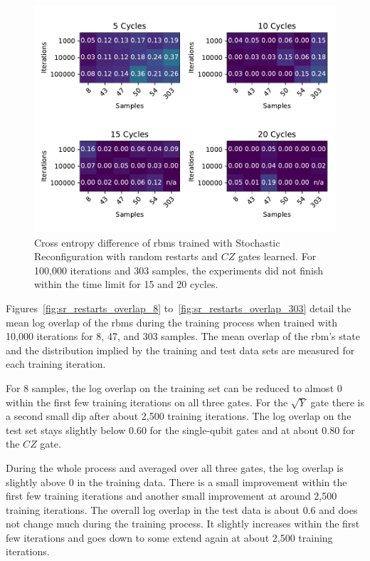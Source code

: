 \begin{figure}[H]
  \centering
  \includegraphics[width=\textwidth]{figures/results/sr-restarts-learned/fxeb_heatmap.pdf}
  \caption[Cross Entropy Difference of RBMs Trained with Stochastic Reconfiguration with Random Restarts and $CZ$ Gates Learned]{
  Cross entropy difference of \gls{rbm}s trained with Stochastic Reconfiguration with random restarts and $CZ$ gates learned.
  For 100,000 iterations and 303 samples, the experiments did not finish within the time limit for 15 and 20 cycles.}
  \label{fig:sr_restarts_fxeb}
\end{figure}

Figures~\ref{fig:sr_restarts_overlap_8} to~\ref{fig:sr_restarts_overlap_303} detail the mean log overlap of the \gls{rbm}s during the 
training process when trained with 10,000 iterations for 8, 47, and 303 samples. The 
mean overlap of the \gls{rbm}'s state and the distribution implied by the training and test data sets are measured 
for each training iteration.

For 8 samples, the log overlap on the training set can be reduced to almost 0 within the first few training iterations 
on all three gates. For the $\sqrt{Y}$ gate there is a second small dip after about 2,500 training iterations. 
The log overlap on the test set stays slightly below $0.60$ for the single-qubit gates and at about $0.80$ for the 
$CZ$ gate. 

During the whole process and averaged over all three gates, the log overlap is slightly above $0$ in the training data. There is a small 
improvement within the first few training iterations and another small improvement at around 2,500 training iterations. 
The overall log overlap in the test data is about $0.6$ and does not change much during the training process. It 
slightly increases within the first few iterations and goes down to some extend again at about 2,500 training iterations.

